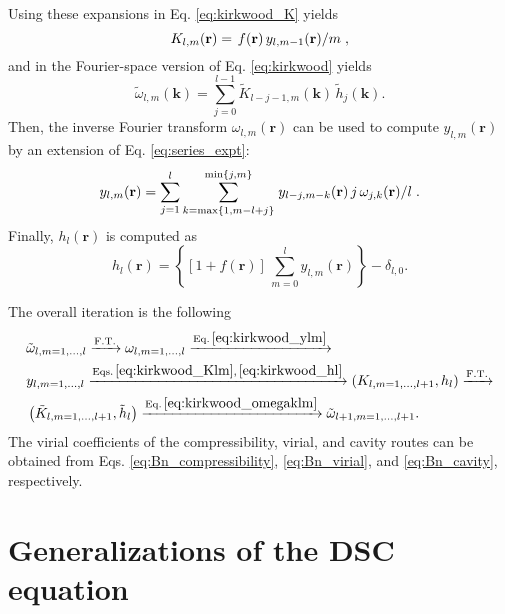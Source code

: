 \documentclass[aip,jcp,preprint,superscriptaddress,showpacs,preprintnumbers,amsmath,amssymb]{revtex4-1}
\numberwithin{equation}{section}
\newcommand{\vct}[1]{\mathbf{#1}}
\providecommand{\vr}{} %
\renewcommand{\vr}{\vct{r}}
\newcommand{\vk}{\vct{k}}
\begin{document}
Using these expansions in Eq. \eqref{eq:kirkwood_K} yields
%
\begin{equation}
K_{l,m}(\vr)
=
\left.
  f(\vr) \, y_{l,m-1}(\vr)
\middle/
  m
\right.,
\label{eq:kirkwood_Klm}
\end{equation}
%
and in the Fourier-space version of
Eq. \eqref{eq:kirkwood} yields
%
\begin{equation}
\tilde \omega_{l,m}(\vk)
=
\sum_{j = 0}^{l - 1}
\tilde K_{l - j - 1, m}(\vk) \,
\tilde h_j(\vk).
\label{eq:kirkwood_omegaklm}
\end{equation}
%
Then,
the inverse Fourier transform $\omega_{l,m}(\vr)$
can be used to compute $y_{l,m}(\vr)$
by an extension of Eq. \eqref{eq:series_expt}:
%
%
%
\begin{equation}
y_{l,m}(\vr)
=
\sum_{ j = 1 }^l
\sum_{ k = \max\{1, m - l + j\} }^{ \min\{j, m\} }
\left.
  y_{l-j, m-k}(\vr) \, j \, \omega_{j, k}(\vr)
\middle/
  l
\right..
\label{eq:kirkwood_ylm}
\end{equation}
%
%
%
Finally, $h_l(\vr)$ is computed as
%
%
%
\begin{equation}
h_l(\vr)
=
\left\{
  [1 + f(\vr)] \,
  \sum_{m = 0}^l y_{l,m}(\vr)
\right\}
- \delta_{l,0}.
\label{eq:kirkwood_hl}
\end{equation}



The overall iteration is the following
%
%
%
\begin{align*}
&
\tilde\omega_{l, m = 1, \dots, l}
\xrightarrow{ \mathrm{F.T.} }
\omega_{l, m = 1, \dots, l}
\xrightarrow{ \mathrm{Eq.\,\eqref{eq:kirkwood_ylm}} }
\\
&
y_{l, m = 1, \dots, l}
\xrightarrow{ \mathrm{Eqs.\,\eqref{eq:kirkwood_Klm},\,
                            \eqref{eq:kirkwood_hl} } }
\left(
K_{l, m = 1, \dots, l+1}, h_l
\right)
\xrightarrow{ \mathrm{F.T.} }
\\
&
\left(
\tilde K_{l, m = 1, \dots, l+1}, \tilde h_l
\right)
\xrightarrow{ \mathrm{Eq.\,\eqref{eq:kirkwood_omegaklm}} }
\tilde \omega_{l+1, m = 1, \dots, l+1}.
\end{align*}
%
%
%
The virial coefficients of
the compressibility, virial, and cavity routes
can be obtained from Eqs.
\eqref{eq:Bn_compressibility},
\eqref{eq:Bn_virial},
and
\eqref{eq:Bn_cavity},
respectively.





\section{\label{sec:extension}
Generalizations of the DSC equation}
\end{document}
